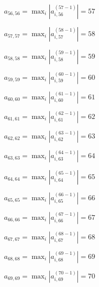 \documentclass[a4paper,12pt]{article}
\begin{document}
$a _{ 56, 56 } =  \max _i |a _{ i, 56 } ^{ (57 - 1) } | = 57$

$a _{ 57, 57 } =  \max _i |a _{ i, 57 } ^{ (58 - 1) } | = 58$

$a _{ 58, 58 } =  \max _i |a _{ i, 58 } ^{ (59 - 1) } | = 59$

$a _{ 59, 59 } =  \max _i |a _{ i, 59 } ^{ (60 - 1) } | = 60$

$a _{ 60, 60 } =  \max _i |a _{ i, 60 } ^{ (61 - 1) } | = 61$

$a _{ 61, 61 } =  \max _i |a _{ i, 61 } ^{ (62 - 1) } | = 62$

$a _{ 62, 62 } =  \max _i |a _{ i, 62 } ^{ (63 - 1) } | = 63$

$a _{ 63, 63 } =  \max _i |a _{ i, 63 } ^{ (64 - 1) } | = 64$

$a _{ 64, 64 } =  \max _i |a _{ i, 64 } ^{ (65 - 1) } | = 65$

$a _{ 65, 65 } =  \max _i |a _{ i, 65 } ^{ (66 - 1) } | = 66$

$a _{ 66, 66 } =  \max _i |a _{ i, 66 } ^{ (67 - 1) } | = 67$

$a _{ 67, 67 } =  \max _i |a _{ i, 67 } ^{ (68 - 1) } | = 68$

$a _{ 68, 68 } =  \max _i |a _{ i, 68 } ^{ (69 - 1) } | = 69$

$a _{ 69, 69 } =  \max _i |a _{ i, 69 } ^{ (70 - 1) } | = 70$
\end{document}

